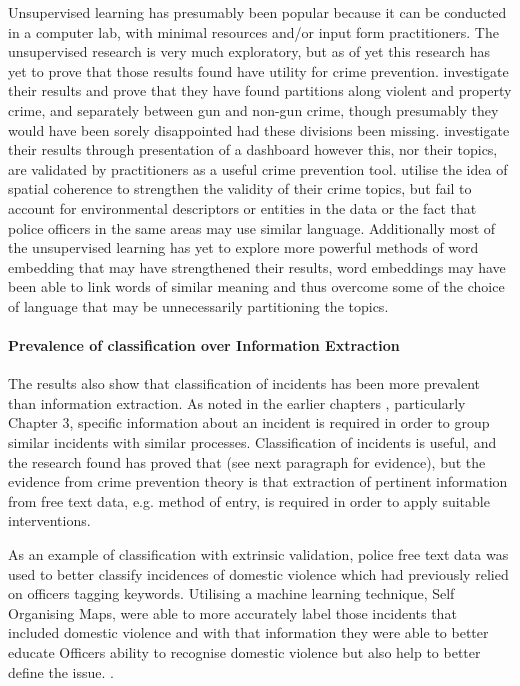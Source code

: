 Unsupervised learning has presumably been popular because it can be conducted in a computer lab, with minimal resources and/or input form practitioners. The unsupervised research is very much exploratory, but as of yet this research has yet to prove that those results found have utility for crime prevention. \textcite{kuang2017crime}  investigate their results and prove that they have found partitions along violent and property crime, and separately between gun and non-gun crime, though presumably they would have been sorely disappointed had these divisions been missing. \textcite{birks2020unsupervised}  investigate their results through presentation of a dashboard however this, nor their topics, are validated by practitioners as a useful crime prevention tool.  \textcite{Pandey201876} utilise the idea of spatial coherence to strengthen the validity of their crime topics, but fail to account for environmental descriptors or entities in the data or the fact that police officers in the same areas may use similar language. Additionally most of the unsupervised learning has yet to explore more powerful methods of word embedding that may have strengthened their results, word embeddings may have been able to link words of  similar meaning and thus overcome some of the choice of language that may be unnecessarily partitioning the topics.


\paragraph{Prevalence of classification over Information Extraction}

The results also show that classification of incidents has been more prevalent than information extraction. As noted in the earlier chapters , particularly Chapter 3, specific information about an incident is required in order to group similar incidents with similar processes. Classification of incidents is useful, and the research found has proved that (see next paragraph for evidence), but the evidence from crime prevention theory is that extraction of pertinent information from free text data, e.g. method of entry, is required in order to apply suitable interventions.  

As an example of classification with extrinsic validation, police free text data was used to better classify incidences of domestic violence which had previously relied on officers tagging keywords. Utilising a machine learning technique,  Self Organising Maps, \textcite{Poelmans200911864} were able to more accurately label those incidents that included domestic violence and with that information they were able to better educate Officers ability to recognise domestic violence but also help to better define the issue. \parencite{ Poelmans2009247, Poelmans20113870, Poelmans200911864}.


